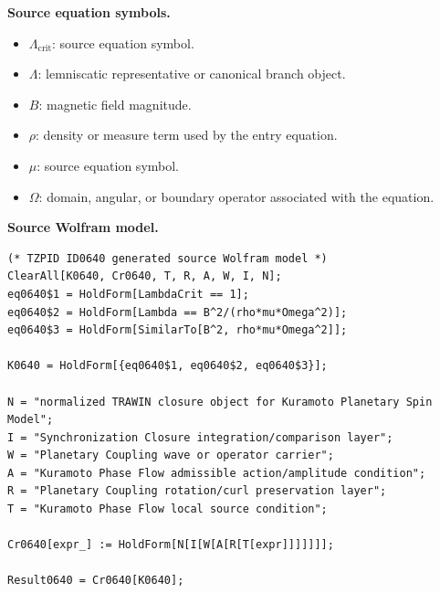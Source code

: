\begin{minipage}[t]{0.49\linewidth}
\begingroup
\small
\raggedright
\textbf{Source equation symbols.}\par
\begin{itemize}[leftmargin=1.35em,itemsep=1pt,topsep=1pt,parsep=0pt]
    \item $\Lambda_{\mathrm{crit}}$: source equation symbol.
    \item $\Lambda$: lemniscatic representative or canonical branch object.
    \item $B$: magnetic field magnitude.
    \item $\rho$: density or measure term used by the entry equation.
    \item $\mu$: source equation symbol.
    \item $\Omega$: domain, angular, or boundary operator associated with the equation.
\end{itemize}
\endgroup
\end{minipage}\hfill
\begin{minipage}[t]{0.47\linewidth}
\begingroup
\scriptsize
\raggedright
\textbf{Source Wolfram model.}\par
\begin{Verbatim}[fontsize=\tiny,breaklines=true,breakanywhere=true]
(* TZPID ID0640 generated source Wolfram model *)
ClearAll[K0640, Cr0640, T, R, A, W, I, N];
eq0640$1 = HoldForm[LambdaCrit == 1];
eq0640$2 = HoldForm[Lambda == B^2/(rho*mu*Omega^2)];
eq0640$3 = HoldForm[SimilarTo[B^2, rho*mu*Omega^2]];

K0640 = HoldForm[{eq0640$1, eq0640$2, eq0640$3}];

N = "normalized TRAWIN closure object for Kuramoto Planetary Spin Model";
I = "Synchronization Closure integration/comparison layer";
W = "Planetary Coupling wave or operator carrier";
A = "Kuramoto Phase Flow admissible action/amplitude condition";
R = "Planetary Coupling rotation/curl preservation layer";
T = "Kuramoto Phase Flow local source condition";

Cr0640[expr_] := HoldForm[N[I[W[A[R[T[expr]]]]]]];

Result0640 = Cr0640[K0640];
\end{Verbatim}
\endgroup
\end{minipage}

